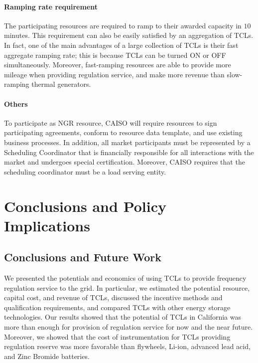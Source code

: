 \documentclass[onecolumn,journal]{IEEEtran}
\begin{document}
\paragraph{Ramping rate requirement} The participating resources are required to ramp to their  awarded capacity in $10$ minutes.  This requirement can also be easily satisfied by an aggregation of \acp{TCL}. In fact, one of the main advantages of a large collection of \acp{TCL} is their fast aggregate ramping rate; this is because \acp{TCL} can be turned ON or OFF simultaneously. Moreover, fast-ramping resources are able to provide more mileage when providing regulation service, and make more revenue than slow-ramping thermal generators. 

\paragraph{Others} To participate as NGR resource, \ac{CAISO} will require resources to sign participating agreements, conform to resource data template, and use existing business processes. In addition, all market participants must be represented by a Scheduling Coordinator that is financially responsible for all interactions with the market and undergoes special certification. Moreover, CAISO requires that the scheduling coordinator must be a load serving entity. 


\section{Conclusions and Policy Implications}
\label{sec:conclusion}


\subsection{Conclusions and Future Work}
We presented the potentials and economics of using \acp{TCL} to provide frequency regulation service to the grid. In particular, we estimated the potential resource, capital cost, and revenue of \acp{TCL}, discussed the incentive methods and qualification requirements, and compared \acp{TCL} with other energy storage technologies. Our results showed that the potential of \acp{TCL} in California was more than enough for provision of regulation service for now and the near future. Moreover, we showed  that the cost of instrumentation for \acp{TCL} providing regulation reserve was more favorable than flywheels, Li-ion, advanced lead acid, and Zinc Bromide batteries. 
\end{document}
